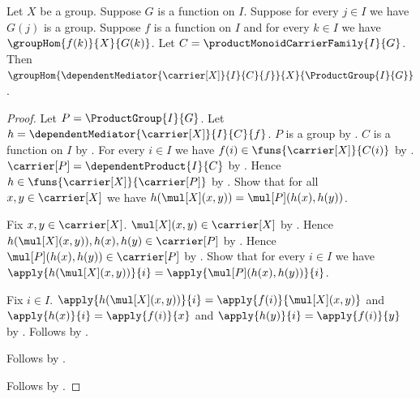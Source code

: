 \begin{theorem}\label{product_group_mediator_hom}
    Let $X$ be a group.
    Suppose $G$ is a function on $I$.
    Suppose for every $j\in I$ we have $G(j)$ is a group.
    Suppose $f$ is a function on $I$ and for every $k\in I$ we have
        $\groupHom{f(k)}{X}{G(k)}$.
    Let $C=\productMonoidCarrierFamily{I}{G}$.
    Then
        $\groupHom{\dependentMediator{\carrier[X]}{I}{C}{f}}{X}{
            \ProductGroup{I}{G}}$.
\end{theorem}
\begin{proof}
    Let $P=\ProductGroup{I}{G}$.
    Let $h=\dependentMediator{\carrier[X]}{I}{C}{f}$.
    $P$ is a group by .
    $C$ is a function on $I$ by
        .
    For every $i\in I$ we have $f(i)\in\funs{\carrier[X]}{C(i)}$ by
        .
    $\carrier[P]=\dependentProduct{I}{C}$ by
        .
    Hence $h\in\funs{\carrier[X]}{\carrier[P]}$ by
        .
    Show that for all $x,y\in\carrier[X]$ we have
        $h(\mul[X](x,y))=\mul[P](h(x),h(y))$.
    \begin{subproof}
        Fix $x,y\in\carrier[X]$.
        $\mul[X](x,y)\in\carrier[X]$ by
            .
        Hence $h(\mul[X](x,y)),h(x),h(y)\in\carrier[P]$ by
            .
        Hence $\mul[P](h(x),h(y))\in\carrier[P]$ by
            .
        Show that for every $i\in I$ we have
            $\apply{h(\mul[X](x,y))}{i}
                =\apply{\mul[P](h(x),h(y))}{i}$.
        \begin{subproof}
            Fix $i\in I$.
            $\apply{h(\mul[X](x,y))}{i}
                =\apply{f(i)}{\mul[X](x,y)}$ and
                $\apply{h(x)}{i}=\apply{f(i)}{x}$ and
                $\apply{h(y)}{i}=\apply{f(i)}{y}$ by
                .
            Follows by
                .
        \end{subproof}
        Follows by .
    \end{subproof}
    Follows by .
\end{proof}

